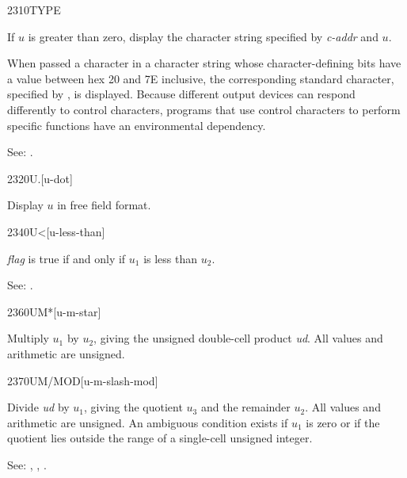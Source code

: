 \begin{newword}{2310}{TYPE}

	If $u$ is greater than zero, display the character string
	specified by \emph{c-addr} and $u$.

	When passed a character in a character string whose
	character-defining bits have a value between hex 20 and 7E
	inclusive, the corresponding standard character, specified
	by , is displayed.
	Because different output devices can respond differently to
	control characters, programs that use control characters to
	perform specific functions have an environmental dependency.

\item[See:]
	.
\end{newword}


\begin{newword}{2320}{U.}[u-dot]

	Display $u$ in free field format.
\end{newword}


\begin{newword}[Uless]{2340}{U<}[u-less-than]

	\emph{flag} is true if and only if $u_1$ is less than $u_2$.

\item[See:]
	.
\end{newword}


\begin{newword}{2360}{UM*}[u-m-star]

	Multiply $u_1$ by $u_2$, giving the unsigned double-cell
	product \emph{ud}. All values and arithmetic are unsigned.
\end{newword}


\begin{newword}{2370}{UM/MOD}[u-m-slash-mod]

	Divide \emph{ud} by $u_1$, giving the quotient $u_3$ and the
	remainder $u_2$. All values and arithmetic are unsigned. An
	ambiguous condition exists if $u_1$ is zero or if the quotient
	lies outside the range of a single-cell unsigned integer.

\item[See:]
	,
	,
	.
\end{newword}


